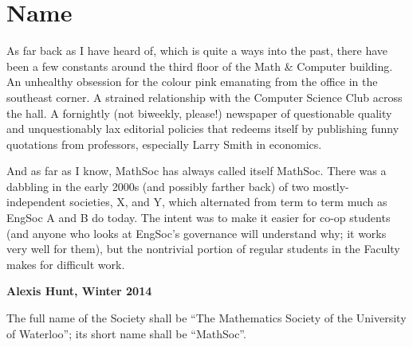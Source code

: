 \section{Name}

\begin{annotation}
As far back as I have heard of, which is quite a ways into the past, there have
been a few constants around the third floor of the Math \& Computer building.
An unhealthy obsession for the colour pink emanating from the office in the
southeast corner. A strained relationship with the Computer Science Club across
the hall. A fornightly (not biweekly, please!) newspaper of questionable quality
and unquestionably lax editorial policies that redeems itself by publishing
funny quotations from professors, especially Larry Smith in economics.

And as far as I know, MathSoc has always called itself MathSoc. There was a
dabbling in the early 2000s (and possibly farther back) of two
mostly-independent societies, X, and Y, which alternated from term to term much
as EngSoc A and B do today. The intent was to make it easier for co-op students
(and anyone who looks at EngSoc's governance will understand why; it works very
 well for them), but the nontrivial portion of regular students in the Faculty
makes for difficult work.

\textbf{Alexis Hunt, Winter 2014}
\end{annotation}

The full name of the Society shall be ``The Mathematics Society of the University
of Waterloo''; its short name shall be ``MathSoc''.
